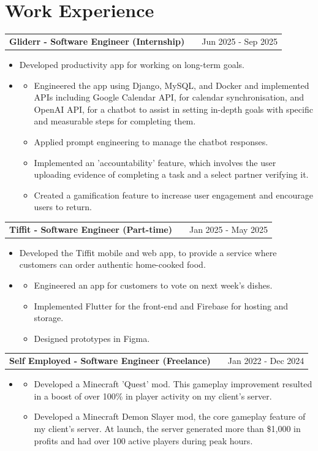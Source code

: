 \documentclass[a4paper,12pt]{article}
\makeatletter
\newenvironment{joblong}[2]
    {
    \begin{tabularx}{\linewidth}{@{}l X r@{}}
    \textbf{#1} & \hfill &  #2 \\[3.75pt]
    \end{tabularx}
    \begin{minipage}[t]{\linewidth}
    \begin{itemize}[nosep,after=\strut, leftmargin=0em, itemsep=3pt,label=--]
    }
    {
    \end{itemize}
    \end{minipage}    
    }
\makeatother
\begin{document}
\section{Work Experience}

\begin{joblong}{Gliderr - Software Engineer (Internship)}{Jun 2025 - Sep 2025}
\item Developed productivity app for working on long-term goals.
\item 
\begin{itemize}
\item Engineered the app using Django, MySQL, and Docker and implemented APIs including Google Calendar API, for calendar synchronisation, and OpenAI API, for a chatbot to assist in setting in-depth goals with specific and measurable steps for completing them.
\item Applied prompt engineering to manage the chatbot responses.
\item Implemented an 'accountability' feature, which involves the user uploading evidence of completing a task and a select partner verifying it.
\item Created a gamification feature to increase user engagement and encourage users to return.
\end{itemize}
\end{joblong}

\vspace{-1em}

\begin{joblong}{Tiffit - Software Engineer (Part-time)}{Jan 2025 - May 2025}
\item Developed the Tiffit mobile and web app, to provide a service where customers can order authentic home-cooked food.
\item 
\begin{itemize}
\item Engineered an app for customers to vote on next week's dishes.
\item Implemented Flutter for the front-end and Firebase for hosting and storage.
\item Designed prototypes in Figma.
\end{itemize}
\end{joblong}

\vspace{-1em}

\begin{joblong}{Self Employed - Software Engineer (Freelance)}{Jan 2022 - Dec 2024}
\item 
\begin{itemize}
\item Developed a Minecraft 'Quest' mod. This gameplay improvement resulted in a boost of over 100\% in player activity on my client's server.
\item Developed a Minecraft Demon Slayer mod, the core gameplay feature of my client's server. At launch, the server generated more than \$1,000 in profits and had over 100 active players during peak hours.
\end{itemize}
\end{joblong}
\end{document}
